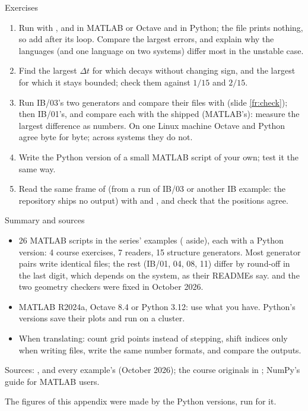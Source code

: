 \documentclass[aspectratio=169,11pt]{beamer}
\begin{document}
\begin{frame}{Exercises}
\label{fr:exercises}
\footnotesize
\begin{enumerate}\setlength{\itemsep}{2pt}
  \item Run  with ,  and  in MATLAB or Octave and in Python; the  file prints nothing, so add  after its loop. Compare the largest errors, and explain why the languages (and one language on two systems) differ most in the unstable case.
  \item Find the largest $\Delta t$ for which  decays without changing sign, and the largest for which it stays bounded; check them against $1/15$ and $2/15$.
  \item Run IB/03's two generators and compare their files with  (slide \ref{fr:check}); then IB/01's, and compare each  with the shipped  (MATLAB's): measure the largest difference as numbers. On one Linux machine Octave and Python agree byte for byte; across systems they do not.
  \item Write the Python version of a small MATLAB script of your own; test it the same way.
  \item Read the same frame of  (from a run of IB/03 or another IB example: the repository ships no output) with  and , and check that the positions agree.
\end{enumerate}
\end{frame}

\begin{frame}{Summary and sources}
\label{fr:summary}
\footnotesize
\begin{itemize}\setlength{\itemsep}{2pt}
  \item 26 MATLAB scripts in the series' examples ( aside), each with a Python version: 4 course exercises, 7 readers, 15 structure generators. Most generator pairs write identical files; the rest (IB/01, 04, 08, 11) differ by round-off in the last digit, which depends on the system, as their READMEs say.  and the two geometry checkers were fixed in October 2026.
  \item MATLAB R2024a, Octave 8.4 or Python 3.12: use what you have. Python's versions save their plots and run on a cluster.
  \item When translating: count grid points instead of stepping, shift indices only when writing files, write the same number formats, and compare the outputs.
\end{itemize}
\vspace{1mm}
\footnotesize Sources: ,  and every example's  (October 2026); the course originals in ; NumPy's guide for MATLAB users.
\begin{punchbox}
\small The figures of this appendix were made by the Python versions, run for it.
\end{punchbox}
\end{frame}
\end{document}
